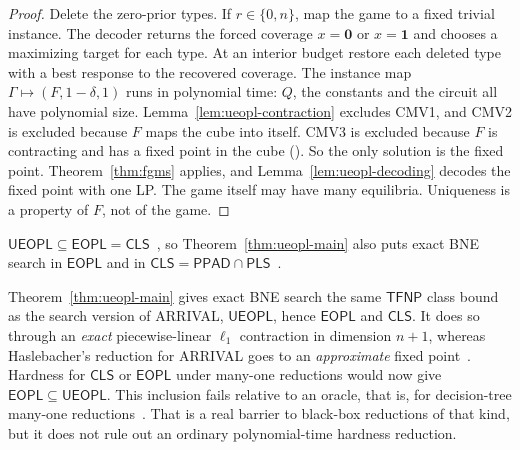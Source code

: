 \begin{proof}
Delete the zero-prior types. If $r\in\{0,n\}$, map the game to a fixed
trivial instance. The decoder returns the forced coverage $x=\mathbf 0$
or $x=\mathbf 1$ and chooses a maximizing target for each type.
At an interior budget restore each deleted type with a best response to the recovered coverage.
The instance map $\Gamma\mapsto(F,1-\delta,1)$ runs in polynomial time: $Q$, the constants and the
circuit all have polynomial size. Lemma~\ref{lem:ueopl-contraction} excludes CMV1, and CMV2 is excluded
because $F$ maps the cube into itself. CMV3 is excluded because $F$ is contracting and has a fixed point
in the cube (\cite[Lemmas~30--31 and the remark after Def.~32]{fgms18}). So the only solution is the fixed point. Theorem~\ref{thm:fgms} applies, and
Lemma~\ref{lem:ueopl-decoding} decodes the fixed point with one LP. The game itself may have many
equilibria. Uniqueness is a property of $F$, not of the game.
\end{proof}

\begin{remark}[CLS]\label{rem:ueopl-cls}
$\mathsf{UEOPL}\subseteq\mathsf{EOPL}=\mathsf{CLS}$~\cite{fgms18,gjhmprt22,fghs23}, so
Theorem~\ref{thm:ueopl-main} also puts exact BNE search in $\mathsf{EOPL}$ and in
$\mathsf{CLS}=\mathsf{PPAD}\cap\mathsf{PLS}$~\cite{fghs23}.
\end{remark}

\begin{remark}\label{rem:ueopl-arrival}
Theorem~\ref{thm:ueopl-main} gives exact BNE search the same $\mathsf{TFNP}$ class bound as the search version of ARRIVAL,
$\mathsf{UEOPL}$, hence $\mathsf{EOPL}$ and $\mathsf{CLS}$. It does so through an \emph{exact}
piecewise-linear $\ell_1$ contraction in dimension $n+1$, whereas Haslebacher's reduction for ARRIVAL
goes to an \emph{approximate} fixed point~\cite{haslebacher25}. Hardness for $\mathsf{CLS}$ or
$\mathsf{EOPL}$ under many-one reductions would now give $\mathsf{EOPL}\subseteq\mathsf{UEOPL}$. This
inclusion fails relative to an oracle, that is, for decision-tree many-one reductions~\cite[Thm.~5]{goos22}.
That is a real barrier to black-box reductions of that kind, but it does not rule out an ordinary
polynomial-time hardness reduction.
\end{remark}

